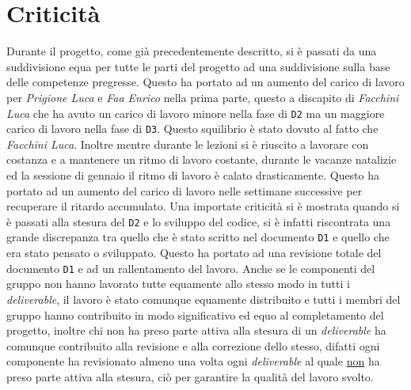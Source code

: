 \chapter{Criticità}
Durante il progetto, come già precedentemente descritto, si è passati da una suddivisione equa per tutte le parti del progetto ad una suddivisione sulla base delle competenze pregresse. Questo ha portato ad un aumento del carico di lavoro per \textit{Prigione Luca} e \textit{Faa Enrico} nella prima parte, questo a discapito di \textit{Facchini Luca} che ha avuto un carico di lavoro minore nella fase di \texttt{D2} ma un maggiore carico di lavoro nella fase di \texttt{D3}. Questo squilibrio è stato dovuto al fatto che \textit{Facchini Luca}. Inoltre mentre durante le lezioni si è riuscito a lavorare con costanza e a mantenere un ritmo di lavoro costante, durante le vacanze natalizie ed la sessione di gennaio il ritmo di lavoro è calato drasticamente. Questo ha portato ad un aumento del carico di lavoro nelle settimane successive per recuperare il ritardo accumulato.\newline
Una importate criticità si è mostrata quando si è passati alla stesura del \texttt{D2} e lo sviluppo del codice, si è infatti riscontrata una grande discrepanza tra quello che è stato scritto nel documento \texttt{D1} e quello che era stato pensato o sviluppato. Questo ha portato ad una revisione totale del documento \texttt{D1} e ad un rallentamento del lavoro. \newline
Anche se le componenti del gruppo non hanno lavorato tutte equamente allo stesso modo in tutti i \textit{deliverable}, il lavoro è stato comunque equamente distribuito e tutti i membri del gruppo hanno contribuito in modo significativo ed equo al completamento del progetto, inoltre chi non ha preso parte attiva alla stesura di un \textit{deliverable} ha comunque contribuito alla revisione e alla correzione dello stesso, difatti ogni componente ha revisionato almeno una volta ogni \textit{deliverable} al quale \underline{non} ha preso parte attiva alla stesura, ciò per garantire la qualità del lavoro svolto.